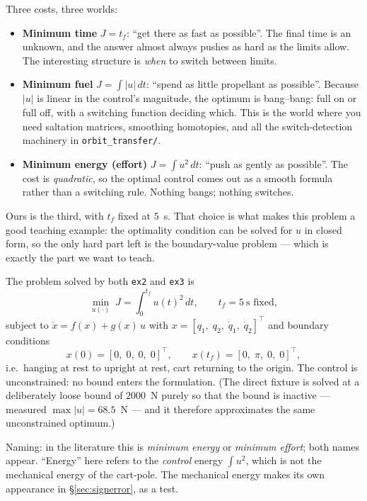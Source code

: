 \documentclass[11pt]{article}
\newcommand{\file}[1]{\texttt{#1}}
\newcommand{\tf}{t_f}
\begin{document}
\begin{intu}
Three costs, three worlds:
\begin{itemize}
\item \textbf{Minimum time} $J=\tf$: ``get there as fast as possible''. The final
  time is an unknown, and the answer almost always pushes as hard as the limits
  allow. The interesting structure is \emph{when} to switch between limits.
\item \textbf{Minimum fuel} $J=\int|u|\,dt$: ``spend as little propellant as
  possible''. Because $|u|$ is linear in the control's magnitude, the optimum
  is bang--bang: full on or full off, with a switching function deciding which.
  This is the world where you need saltation matrices, smoothing homotopies, and
  all the switch-detection machinery in \file{orbit\_transfer/}.
\item \textbf{Minimum energy (effort)} $J=\int u^2\,dt$: ``push as gently as
  possible''. The cost is \emph{quadratic}, so the optimal control comes out as a
  smooth formula rather than a switching rule. Nothing bangs; nothing switches.
\end{itemize}
Ours is the third, with $\tf$ fixed at $5$~s. That choice is what makes this
problem a good teaching example: the optimality condition can be solved for $u$
in closed form, so the only hard part left is the boundary-value problem ---
which is exactly the part we want to teach.
\end{intu}

\begin{rig}
The problem solved by both \file{ex2} and \file{ex3} is
\[
\min_{u(\cdot)}\; J=\int_0^{\tf} u(t)^2\,dt,
\qquad \tf = 5~\text{s fixed},
\]
subject to $\dot x = f(x)+g(x)\,u$ with
$x=[q_1,\;q_2,\;\dot q_1,\;\dot q_2]^\top$ and boundary conditions
\[
x(0)=[0,\;0,\;0,\;0]^\top,\qquad x(\tf)=[0,\;\pi,\;0,\;0]^\top ,
\]
i.e.\ hanging at rest to upright at rest, cart returning to the origin. The
control is unconstrained: no bound enters the formulation. (The direct fixture
is solved at a deliberately loose bound of $2000$~N purely so that the bound is
inactive --- measured $\max|u| = 68.5$~N --- and it therefore approximates the
same unconstrained optimum.)

Naming: in the literature this is \emph{minimum energy} or \emph{minimum
effort}; both names appear. ``Energy'' here refers to the \emph{control} energy
$\int u^2$, which is not the mechanical energy of the cart-pole. The mechanical
energy makes its own appearance in \S\ref{sec:signerror}, as a test.
\end{rig}
\end{document}
